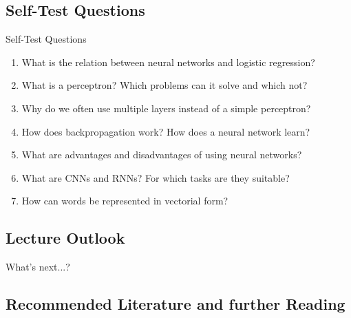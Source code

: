 \subsection{Self-Test Questions}

\begin{frame}{Self-Test Questions}{}\important
	\begin{enumerate}
		\item What is the relation between neural networks and logistic regression?
		\item What is a perceptron? Which problems can it solve and which not?
		\item Why do we often use multiple layers instead of a simple perceptron?
		\item How does backpropagation work? How does a neural network learn?
		\item What are advantages and disadvantages of using neural networks?
		\item What are CNNs and RNNs? For which tasks are they suitable?
		\item How can words be represented in vectorial form?
	\end{enumerate}
\end{frame}


\subsection{Lecture Outlook}

\begin{frame}{What's next...?}{}
\end{frame}


\subsection{Recommended Literature and further Reading}

